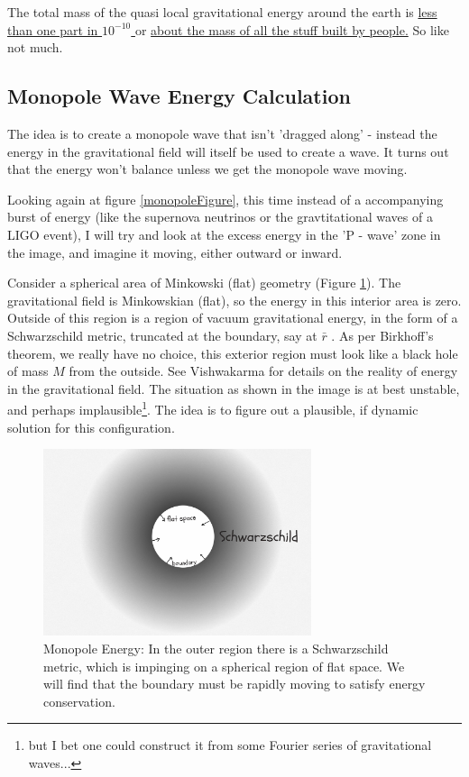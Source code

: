 \documentclass[../rzero]{subfiles}
\begin{document}
The total mass of the quasi local gravitational energy around the earth is  \href{https://www.wolframalpha.com/input?i=%28G*%28mass+of+earth%29%5E2%2F%28c%5E2%2812000km%29%29%29%2F%28mass+of+earth%29}{less than one part in $10^{-10}$ } or \href{https://www.wolframalpha.com/input?i=G*%28mass+of+earth%29%5E2%2F%28c%5E2%2812000km%29%29}{about the mass of all the stuff built by people.} So like not much.

\subsection{Monopole Wave Energy Calculation }
The idea is to create a monopole wave that isn't 'dragged along' - instead the energy in the gravitational field will itself be used to create a wave. It turns out that the energy won't balance unless we get the monopole wave moving.

Looking again at figure \ref{monopoleFigure}, this time instead of a accompanying burst of energy (like the supernova neutrinos or the gravtitational waves of a LIGO event), I will try and look at the excess energy in the 'P - wave' zone in the image, and imagine it moving, either outward or inward. 

Consider a spherical area of Minkowski (flat) geometry (Figure \ref{monopoleEnergy}). The gravitational field is Minkowskian (flat), so the energy in this interior area is zero. Outside of this region is a region of vacuum gravitational energy, in the form of a Schwarzschild metric, truncated at the boundary, say at $\bar r$ . As per Birkhoff's theorem, we really have no choice, this exterior region must look like a black hole of mass $M$ from the outside. See Vishwakarma\cite{vishwakarmaMysteriesRikNovel2014}\cite{vishwakarmaEinsteinCriticalPerspective2016} for details on the reality of energy in the gravitational field. The situation as shown in the image is at best unstable, and perhaps implausible\footnote{but I bet one could construct it from some Fourier series of gravitational waves...}. The idea is to figure out a plausible, if dynamic solution for this configuration. 


\begin{figure}
\includegraphics[width=0.7\textwidth]{chapters/images/monopole-energy.jpg}
\caption{Monopole Energy: In the outer region there is a Schwarzschild metric, which is impinging on a spherical region of flat space. We will find that the boundary must be rapidly moving to satisfy energy conservation.}
\label{monopoleEnergy}
\end{figure}
\end{document}
